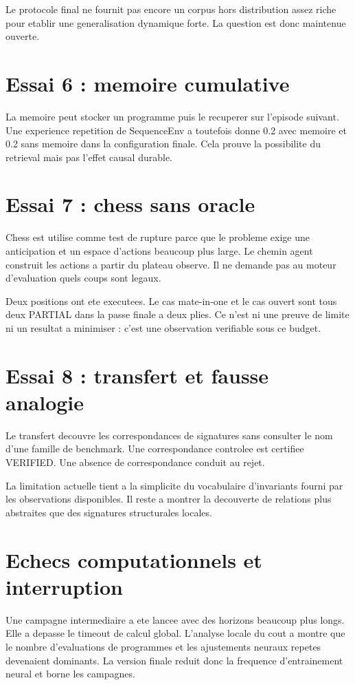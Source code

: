 \documentclass[11pt,a4paper]{article}
\begin{document}
Le protocole final ne fournit pas encore un corpus hors distribution assez riche pour etablir une generalisation dynamique forte. La question est donc maintenue ouverte.

\section{Essai 6 : memoire cumulative}
La memoire peut stocker un programme puis le recuperer sur l'episode suivant. Une experience repetition de SequenceEnv a toutefois donne 0.2 avec memoire et 0.2 sans memoire dans la configuration finale. Cela prouve la possibilite du retrieval mais pas l'effet causal durable.

\section{Essai 7 : chess sans oracle}
Chess est utilise comme test de rupture parce que le probleme exige une anticipation et un espace d'actions beaucoup plus large. Le chemin agent construit les actions a partir du plateau observe. Il ne demande pas au moteur d'evaluation quels coups sont legaux.

Deux positions ont ete executees. Le cas mate-in-one et le cas ouvert sont tous deux PARTIAL dans la passe finale a deux plies. Ce n'est ni une preuve de limite ni un resultat a minimiser : c'est une observation verifiable sous ce budget.

\section{Essai 8 : transfert et fausse analogie}
Le transfert decouvre les correspondances de signatures sans consulter le nom d'une famille de benchmark. Une correspondance controlee est certifiee VERIFIED. Une absence de correspondance conduit au rejet.

La limitation actuelle tient a la simplicite du vocabulaire d'invariants fourni par les observations disponibles. Il reste a montrer la decouverte de relations plus abstraites que des signatures structurales locales.

\section{Echecs computationnels et interruption}
Une campagne intermediaire a ete lancee avec des horizons beaucoup plus longs. Elle a depasse le timeout de calcul global. L'analyse locale du cout a montre que le nombre d'evaluations de programmes et les ajustements neuraux repetes devenaient dominants. La version finale reduit donc la frequence d'entrainement neural et borne les campagnes.
\end{document}
